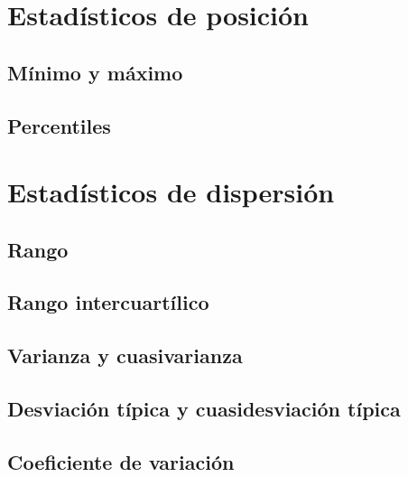 \documentclass[
]{book}
\theoremstyle{definition}
\theoremstyle{definition}
\theoremstyle{definition}
\theoremstyle{definition}
\theoremstyle{remark}
\begin{document}
\hypertarget{estaduxedsticos-de-posiciuxf3n}{%
\section{Estadísticos de posición}\label{estaduxedsticos-de-posiciuxf3n}}

\hypertarget{muxednimo-y-muxe1ximo}{%
\subsection{Mínimo y máximo}\label{muxednimo-y-muxe1ximo}}

\hypertarget{percentiles}{%
\subsection{Percentiles}\label{percentiles}}

\hypertarget{estaduxedsticos-de-dispersiuxf3n}{%
\section{Estadísticos de dispersión}\label{estaduxedsticos-de-dispersiuxf3n}}

\hypertarget{rango}{%
\subsection{Rango}\label{rango}}

\hypertarget{rango-intercuartuxedlico}{%
\subsection{Rango intercuartílico}\label{rango-intercuartuxedlico}}

\hypertarget{varianza-y-cuasivarianza}{%
\subsection{Varianza y cuasivarianza}\label{varianza-y-cuasivarianza}}

\hypertarget{desviaciuxf3n-tuxedpica-y-cuasidesviaciuxf3n-tuxedpica}{%
\subsection{Desviación típica y cuasidesviación típica}\label{desviaciuxf3n-tuxedpica-y-cuasidesviaciuxf3n-tuxedpica}}

\hypertarget{coeficiente-de-variaciuxf3n}{%
\subsection{Coeficiente de variación}\label{coeficiente-de-variaciuxf3n}}
\end{document}
